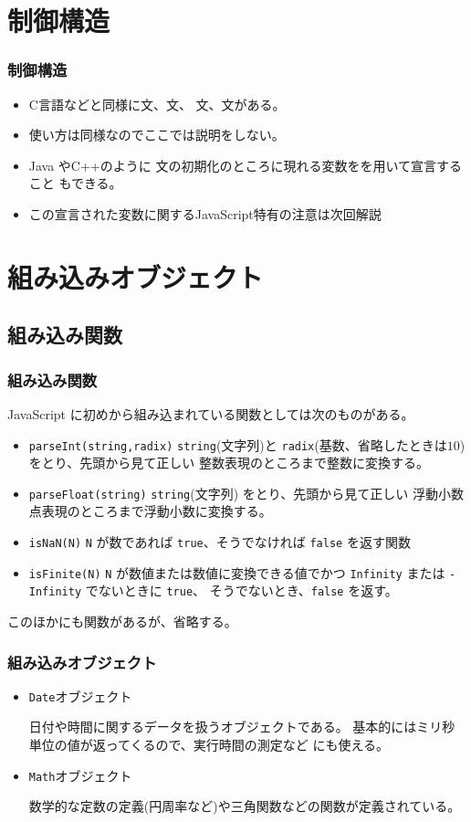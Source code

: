 \section{制御構造}
\begin{frame}[containsverbatim]
 \frametitle{制御構造}
 \begin{itemize}
  \item C言語などと同様に文、文、
文、文がある。
  \item 使い方は同様なのでここでは説明をしない。
  \item Java やC++のように
文の初期化のところに現れる変数をを用いて宣言すること
もできる。
  \item この宣言された変数に関するJavaScript特有の注意は次回解説
 \end{itemize}
\end{frame}
 \section{組み込みオブジェクト}
\subsection{組み込み関数}
\begin{frame}[containsverbatim]
 \frametitle{組み込み関数}
JavaScript に初めから組み込まれている関数としては次のものがある。
\begin{itemize}
 \item \Verb+parseInt(string,radix)+ \Verb+string+(文字列)と
       \Verb+radix+(基数、省略したときは$10$)をとり、先頭から見て正しい
       整数表現のところまで整数に変換する。
 \item \Verb+parseFloat(string)+ \Verb+string+(文字列)
       をとり、先頭から見て正しい
       浮動小数点表現のところまで浮動小数に変換する。
 \item \Verb+isNaN(N)+ \Verb+N+ が数であれば \Verb+true+、そうでなければ
       \Verb+false+ を返す関数
 \item \Verb+isFinite(N)+ \Verb+N+ が数値または数値に変換できる値でかつ
       \Verb+Infinity+ または \Verb+-Infinity+ でないときに \Verb+true+、
       そうでないとき、\Verb+false+ を返す。
\end{itemize}
このほかにも関数があるが、省略する。
\end{frame}

\begin{frame}[containsverbatim]
 \frametitle{組み込みオブジェクト}
\begin{itemize}
 \item \texttt{Date}オブジェクト

日付や時間に関するデータを扱うオブジェクトである。
基本的にはミリ秒単位の値が返ってくるので、実行時間の測定など
にも使える。
 \item {\texttt{Math}オブジェクト}

数学的な定数の定義(円周率など)や三角関数などの関数が定義されている。
\end{itemize}
\end{frame}



